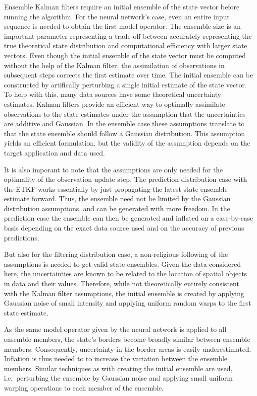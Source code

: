 Ensemble Kalman filters require an initial ensemble of the state vector before running the algorithm.
For the neural network's case, even an entire input sequence is needed to obtain the first model operator.
The ensemble size is an important parameter representing a trade-off between accurately representing the true theoretical state distribution and computational efficiency with larger state vectors.
Even though the initial ensemble of the state vector must be computed without the help of the Kalman filter, the assimilation of observations in subsequent steps corrects the first estimate over time.
The initial ensemble can be constructed by artifically perturbing a single initial estimate of the state vector.
To help with this, many data sources have some theoretical uncertainty estimates.
Kalman filters provide an efficient way to optimally assimilate observations to the state estimates under the assumption that the uncertainties are additive and Gaussian.
In the ensemble case these assumptions translate to that the state ensemble should follow a Gaussian distribution.
This assumption yields an efficient formulation, but the validity of the assumption depends on the target application and data used.

It is also imporant to note that the assumptions are only needed for the optimality of the observation update step.
The prediction distribution case with the ETKF works essentially by just propagating the latest state ensemble estimate forward.
Thus, the ensemble need not be limited by the Gaussian distribution assumptions, and can be generated with more freedom.
In the prediction case the ensemble can then be generated and inflated on a case-by-case basis depending on the exact data source used and on the accuracy of previous predictions.

But also for the filtering distribution case, a non-religious following of the assumptions is needed to get valid state ensembles.
Given the data considered here, the uncertainties are known to be related to the location of spatial objects in data and their values.
Therefore, while not theoretically entirely consistent with the Kalman filter assumptions, the initial ensemble is created by applying Gaussian noise of small intensity and applying uniform random warps to the first state estimate.

As the same model operator given by the neural network is applied to all ensemble members, the state's borders become broadly similar between ensemble members.
Consequently, uncertainty in the border areas is easily underestimated.
Inflation is thus needed to to increase the variation between the ensemble members.
Similar techniques as with creating the initial ensemble are used, i.e.\ perturbing the ensemble by Gaussian noise and applying small uniform warping operations to each member of the ensemble.

